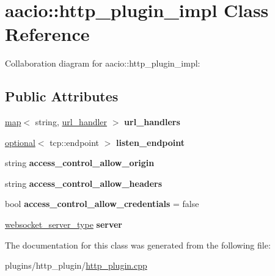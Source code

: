 \hypertarget{classaacio_1_1http__plugin__impl}{}\section{aacio\+:\+:http\+\_\+plugin\+\_\+impl Class Reference}
\label{classaacio_1_1http__plugin__impl}


Collaboration diagram for aacio\+:\+:http\+\_\+plugin\+\_\+impl\+:
\subsection*{Public Attributes}
\begin{DoxyCompactItemize}
\item 
\mbox{\label{classaacio_1_1http__plugin__impl_afd5338f92afd5ef3e7e6424b1d2a6cb9}} 
\mbox{\hyperlink{classstd_1_1map}{map}}$<$ string, \mbox{\hyperlink{http__plugin_8hpp_af4e4e7e4ab464060f4b44e0cf75d1840}{url\+\_\+handler}} $>$ {\bfseries url\+\_\+handlers}
\item 
\mbox{\label{classaacio_1_1http__plugin__impl_af020435268db251c7f7434b3e6552b14}} 
\mbox{\hyperlink{classaacio_1_1optional}{optional}}$<$ tcp\+::endpoint $>$ {\bfseries listen\+\_\+endpoint}
\item 
\mbox{\label{classaacio_1_1http__plugin__impl_a03f936cea5c900784f3c146d0e04ef3e}} 
string {\bfseries access\+\_\+control\+\_\+allow\+\_\+origin}
\item 
\mbox{\label{classaacio_1_1http__plugin__impl_a545710e7ce3b8379c726dc686ccf0896}} 
string {\bfseries access\+\_\+control\+\_\+allow\+\_\+headers}
\item 
\mbox{\label{classaacio_1_1http__plugin__impl_a49391c60d4728a508574d3cf7413944f}} 
bool {\bfseries access\+\_\+control\+\_\+allow\+\_\+credentials} = false
\item 
\mbox{\label{classaacio_1_1http__plugin__impl_ad49b6e08445dbb4c82afdfb2ebfe050b}} 
\mbox{\hyperlink{classwebsocketpp_1_1server}{websocket\+\_\+server\+\_\+type}} {\bfseries server}
\end{DoxyCompactItemize}


The documentation for this class was generated from the following file\+:\begin{DoxyCompactItemize}
\item 
plugins/http\+\_\+plugin/\mbox{\hyperlink{http__plugin_8cpp}{http\+\_\+plugin.\+cpp}}\end{DoxyCompactItemize}
